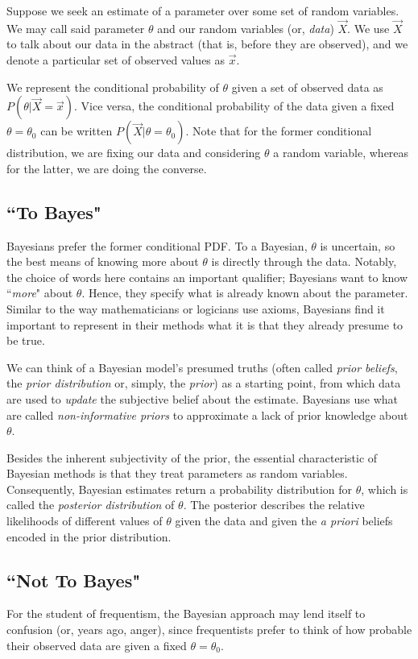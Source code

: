 \documentclass[12pt,twoside]{reedthesis}
\begin{document}
	Suppose we seek an estimate of a parameter over some set of random variables. We may call said parameter $\theta$ and our random variables (or, {\em data}) $\vec{X}$. We use $\vec{X}$ to talk about our data in the abstract (that is, before they are observed), and we denote a particular set of observed values as $\vec{x}$. 

	We represent the conditional probability of $\theta$ given a set of observed data as $P(\theta | \vec{X} = \vec{x})$. Vice versa, the conditional probability of the data given a fixed $\theta = \theta_0$ can be written $P(\vec{X} | \theta = \theta_0)$. Note that for the former conditional distribution, we are fixing our data and considering $\theta$ a random variable, whereas for the latter, we are doing the converse.

	\subsection*{``To Bayes"}
	Bayesians prefer the former conditional PDF. To a Bayesian, $\theta$ is uncertain, so the best means of knowing more about $\theta$ is directly through the data. Notably, the choice of words here contains an important qualifier; Bayesians want to know ``{\em more}" about $\theta$. Hence, they specify what is already known about the parameter. Similar to the way mathematicians or logicians use axioms, Bayesians find it important to represent in their methods what it is that they already presume to be true.
	
	We can think of a Bayesian model's presumed truths (often called {\em prior beliefs}, the {\em prior distribution} or, simply, the {\em prior}) as a starting point, from which data are used to {\em update} the subjective belief about the estimate.  Bayesians use what are called {\em non-informative priors} to approximate a lack of prior knowledge about $\theta$. 
	
	Besides the inherent subjectivity of the prior, the essential characteristic of Bayesian methods is that they treat parameters as random variables. Consequently, Bayesian estimates return a probability distribution for $\theta$, which is called the {\em posterior distribution} of $\theta$. The posterior describes the relative likelihoods of different values of $\theta$ given the data and given the {\em a priori} beliefs encoded in the prior distribution.

	\subsection*{``Not To Bayes"}
	For the student of frequentism, the Bayesian approach may lend itself to confusion (or, years ago, anger), since frequentists prefer to think of how probable their observed data are given a fixed $\theta = \theta_0$.
	
\end{document}
